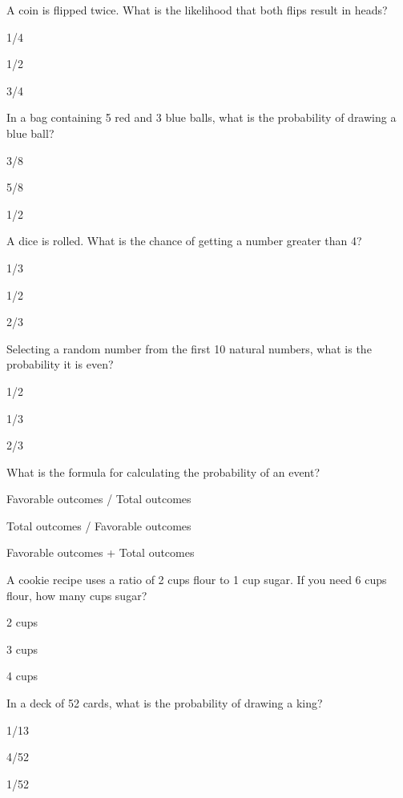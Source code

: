 
\begin{enhancedmcq}{A coin is flipped twice. What is the likelihood that both flips result in heads?}
\item 1/4
\item 1/2
\item 3/4

\end{enhancedmcq}
\begin{enhancedmcq}{In a bag containing 5 red and 3 blue balls, what is the probability of drawing a blue ball?}
\item 3/8
\item 5/8
\item 1/2

\end{enhancedmcq}
\begin{enhancedmcq}{A dice is rolled. What is the chance of getting a number greater than 4?}
\item 1/3
\item 1/2
\item 2/3

\end{enhancedmcq}
\begin{enhancedmcq}{Selecting a random number from the first 10 natural numbers, what is the probability it is even?}
\item 1/2
\item 1/3
\item 2/3

\end{enhancedmcq}
\begin{enhancedmcq}{What is the formula for calculating the probability of an event?}
\item Favorable outcomes / Total outcomes
\item Total outcomes / Favorable outcomes
\item Favorable outcomes + Total outcomes

\end{enhancedmcq}
\begin{enhancedmcq}{A cookie recipe uses a ratio of 2 cups flour to 1 cup sugar. If you need 6 cups flour, how many cups sugar?}
\item 2 cups
\item 3 cups
\item 4 cups

\end{enhancedmcq}
\begin{enhancedmcq}{In a deck of 52 cards, what is the probability of drawing a king?}
\item 1/13
\item 4/52
\item 1/52

\end{enhancedmcq}
